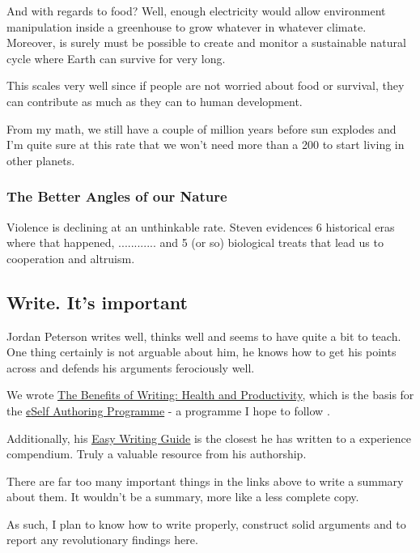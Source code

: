 And with regards to food? Well, enough electricity would allow environment manipulation inside a greenhouse to grow whatever in whatever climate. Moreover, is surely must be possible to create and monitor a sustainable natural cycle where Earth can survive for very long. 

This scales very well since if people are not worried about food or survival, they can contribute as much as they can to human development.

From my math, we still have a couple of million years before sun explodes and I'm quite sure at this rate that we won't need more than a 200 to start living in other planets.



\subsubsection{The Better Angles of our Nature}

Violence is declining at an unthinkable rate. Steven evidences 6 historical eras where that happened, ............ and 5 (or so) biological treats that lead us to cooperation and altruism.




\subsection{Write. It's important}

Jordan Peterson writes well, thinks well and seems to have quite a bit to teach.
One thing certainly is not arguable about him, he knows how to get his points across and defends his arguments ferociously well.

We wrote \href{https://www.jordanbpeterson.com/docs/230/2014/Papers%20from%20previous%20years/Mar.pdf}{\ul{The Benefits of Writing: Health
and Productivity}}, which is the basis for the \href{https://www.selfauthoring.com/}{\a¢{Self Authoring Programme}} - a programme I hope to follow .

Additionally, his \href{https://docs.google.com/viewer?url=http://jordanbpeterson.com/wp-content/uploads/2018/02/Essay_Writing_Guide.docx}{\ul{Easy Writing Guide}} is the closest he has written to a experience compendium. Truly a valuable resource from his authorship.

There are far too many important things in the links above to write a summary about them. It wouldn't be a summary, more like a less complete copy.

As such, I plan to know how to write properly, construct solid arguments and to report any revolutionary findings here.
